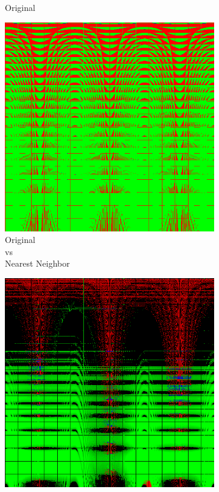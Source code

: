 \begin{figure}[t]
\begin{subfigure}[t]{0.22\textwidth}
		\caption{Original\\ }
		\label{fig:sigUpliftOriginal}
	\end{subfigure} \hspace{0.05em}
	\begin{subfigure}[t]{0.22\textwidth}
		\includegraphics[width=\linewidth]{img/uplifting_diff_originalNeighbor.png}
		\caption{Original\\vs\\Nearest Neighbor}
		\label{fig:sigDiffOrigNeighbor}
	\end{subfigure} \hspace{0.05em}
	\begin{subfigure}[t]{0.22\textwidth}
	\includegraphics[width=\linewidth]{img/uplifting_diff_originalCoef.png}

\end{subfigure}
\end{figure}
